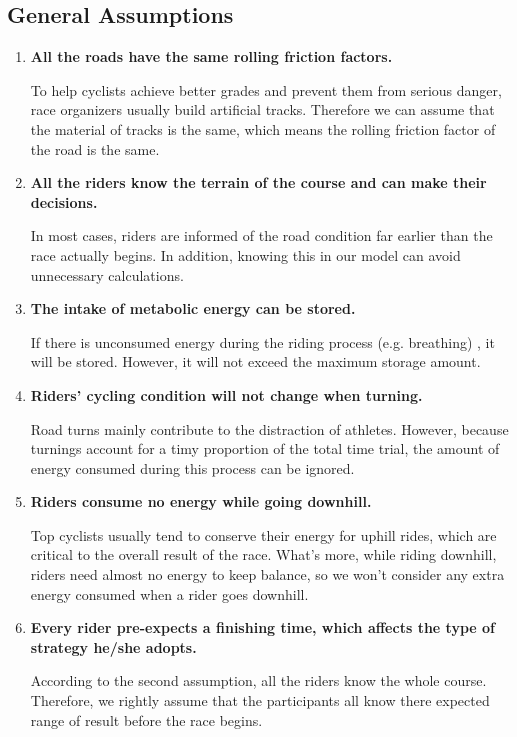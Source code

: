 \documentclass{article}
\begin{document}
		\subsection{General Assumptions}
		\begin{enumerate}
			\item  \textbf{All the roads have the same rolling friction factors.}

					To help cyclists achieve better grades and prevent them from serious danger, race organizers usually build artificial tracks. Therefore we can assume that the material of tracks is the same, which means the rolling friction factor of the road is the same.
			\item  \textbf{All the riders know the terrain of the course and can make their decisions.}

					In most cases, riders are informed of the road condition far earlier than the race actually begins. In addition, knowing this in our model can avoid unnecessary calculations.
			\item  \textbf{The intake of metabolic energy can be stored.}

					If there is unconsumed energy during the riding process (e.g. breathing) , it will be stored. However, it will not exceed the maximum storage amount.
			\item  \textbf{Riders' cycling condition will not change when turning.}

					Road turns mainly contribute to the distraction of athletes. However, because turnings account for a timy proportion of the total time trial, the amount of energy consumed during this process can be ignored.
			\item \textbf{Riders consume no energy while going downhill.}

					Top cyclists usually tend to conserve their energy for uphill rides, which are critical to the overall result of the race. What's more, while riding downhill, riders need almost no energy to keep balance, so we won't consider any extra energy consumed when a rider goes downhill.
			\item \textbf{Every rider pre-expects a finishing time, which affects the type of strategy he/she adopts.}

					According to the second assumption, all the riders know the whole course. Therefore, we rightly assume that the participants all know there expected range of result before the race begins.

		\end{enumerate}
\end{document}
